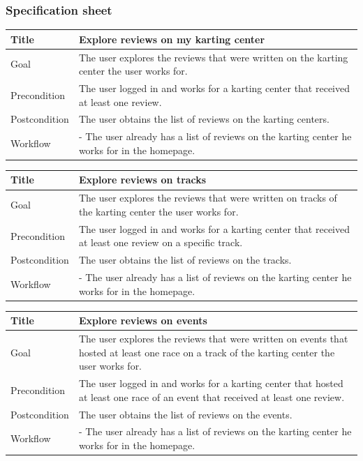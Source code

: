 \documentclass{beamer}
\begin{document}
\begin{frame}
    \frametitle{Specification sheet}
    \begin{table}
        \tiny
        \begin{tabular}{|p{2cm}|p{6cm}|}
        \hline  
        Title & \textbf{Explore reviews on my karting center} \\
        \hline
        Goal & The user explores the reviews that were written on the karting center the user works for. \\
        \hline
        Precondition & The user logged in and works for a karting center that received
        at least one review. \\
        \hline
        Postcondition & The user obtains the list of reviews on the karting centers. \\
        \hline
        Workflow &
        - The user already has a list of reviews on the karting center he works for in the homepage. \\
        \hline
        \end{tabular}
\end{table}

\begin{table}
    \tiny
    \begin{tabular}{|p{2cm}|p{6cm}|}
    \hline  
    Title & \textbf{Explore reviews on tracks} \\
    \hline
    Goal & The user explores the reviews that were written on tracks of the karting center the user works for. \\
    \hline
    Precondition & The user logged in and works for a karting center that received
    at least one review on a specific track. \\
    \hline
    Postcondition & The user obtains the list of reviews on the tracks. \\
    \hline
    Workflow &
    - The user already has a list of reviews on the karting center he works for in the homepage. \\
    \hline
    \end{tabular}
\end{table}

\begin{table}
    \tiny
    \begin{tabular}{|p{2cm}|p{6cm}|}
    \hline  
    Title & \textbf{Explore reviews on events} \\
    \hline
    Goal & The user explores the reviews that were written on events that hosted at least one race
    on a track of the karting center the user works for. \\
    \hline
    Precondition & The user logged in and works for a karting center that hosted at least one race 
    of an event that received at least one review. \\
    \hline
    Postcondition & The user obtains the list of reviews on the events. \\
    \hline
    Workflow &
    - The user already has a list of reviews on the karting center he works for in the homepage. \\
    \hline
    \end{tabular}
\end{table}


\end{frame}
\end{document}
